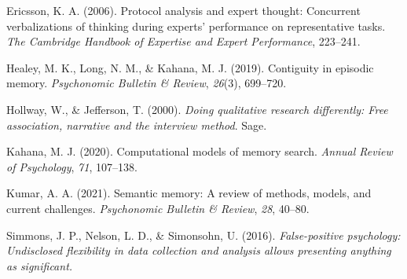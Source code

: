 \documentclass[
  letterpaper,
  DIV=11,
  numbers=noendperiod]{scrreprt}
\newlength{\cslhangindent}
\newlength{\cslentryspacingunit} %
\newenvironment{CSLReferences}[2] %
 {%
  \setlength{\parindent}{0pt}
  \ifodd #1
  \let\oldpar\par
  \def\par{\hangindent=\cslhangindent\oldpar}
  \fi
  \setlength{\parskip}{#2\cslentryspacingunit}
 }%
 {}
\begin{document}
\hypertarget{refs}{}
\begin{CSLReferences}{1}{0}
\leavevmode{}%
Ericsson, K. A. (2006). Protocol analysis and expert thought: Concurrent
verbalizations of thinking during experts' performance on representative
tasks. \emph{The Cambridge Handbook of Expertise and Expert
Performance}, 223--241.

\leavevmode{}%
Healey, M. K., Long, N. M., \& Kahana, M. J. (2019). Contiguity in
episodic memory. \emph{Psychonomic Bulletin \& Review}, \emph{26}(3),
699--720.

\leavevmode{}%
Hollway, W., \& Jefferson, T. (2000). \emph{Doing qualitative research
differently: Free association, narrative and the interview method}.
Sage.

\leavevmode{}%
Kahana, M. J. (2020). Computational models of memory search.
\emph{Annual Review of Psychology}, \emph{71}, 107--138.

\leavevmode{}%
Kumar, A. A. (2021). Semantic memory: A review of methods, models, and
current challenges. \emph{Psychonomic Bulletin \& Review}, \emph{28},
40--80.

\leavevmode{}%
Simmons, J. P., Nelson, L. D., \& Simonsohn, U. (2016).
\emph{False-positive psychology: Undisclosed flexibility in data
collection and analysis allows presenting anything as significant.}

\end{CSLReferences}
\end{document}
